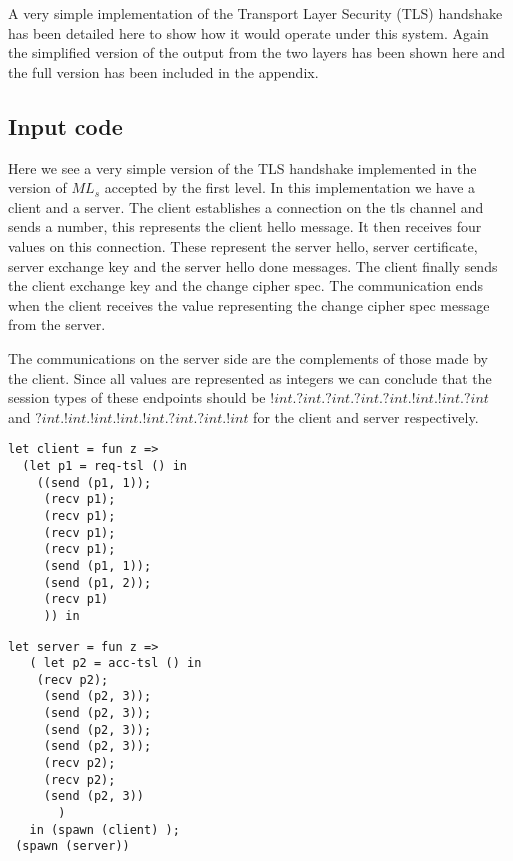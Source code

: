 A very simple implementation of the Transport Layer Security (TLS) handshake has been detailed here to show how it would operate under this system. Again the simplified version of the output from the two layers has been shown here and the full version has been included in the appendix. 

\subsection{Input code}

Here we see a very simple version of the TLS handshake implemented in the version of $ML_s$ accepted by the first level. In this implementation we have a client and a server. The client establishes a connection on the tls channel and sends a number, this represents the client hello message. It then receives four values on this connection. These represent the server hello, server certificate, server exchange key and the server hello done messages. The client finally sends the client exchange key and the change cipher spec. The communication ends when the client receives the value representing the change cipher spec message from the server. 

The communications on the server side are the complements of those made by the client. Since all values are represented as integers we can conclude that the session types of these endpoints should  be $!int.?int.?int.?int.?int.!int.!int.?int$ and $?int.!int.!int.!int.!int.?int.?int.!int$ for the client and server respectively. 


\begin{minipage}{.45\textwidth}
\begin{lstlisting}[backgroundcolor=\color{white},numbers=none]
let client = fun z =>
  (let p1 = req-tsl () in
    ((send (p1, 1));
     (recv p1);
     (recv p1);
     (recv p1);
     (recv p1);
     (send (p1, 1));
     (send (p1, 2));
     (recv p1)
     )) in
\end{lstlisting}
\end{minipage}
\hfill
\begin{minipage}{.45\textwidth}
\begin{lstlisting}[backgroundcolor=\color{white},numbers=none]
 let server = fun z =>
   ( let p2 = acc-tsl () in
    (recv p2);
     (send (p2, 3));
     (send (p2, 3));
     (send (p2, 3));
     (send (p2, 3));
     (recv p2);
     (recv p2);
     (send (p2, 3))
       )
   in (spawn (client) );
 (spawn (server))
\end{lstlisting}
\end{minipage}

